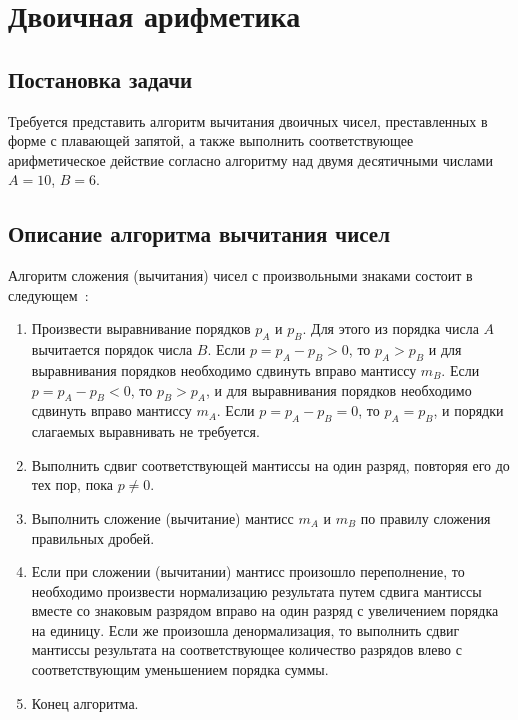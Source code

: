 \section{Двоичная арифметика}

\subsection{Постановка задачи}

Требуется представить алгоритм вычитания двоичных чисел, преставленных в форме с плавающей запятой,
а также выполнить соответствующее арифметическое действие согласно алгоритму над двумя десятичными
числами $A = 10$, $B = 6$.

\subsection{Описание алгоритма вычитания чисел}

Алгоритм сложения (вычитания) чисел с произвольными знаками состоит в следующем~\cite{lua}:

\begin{enumerate}
    \item Произвести выравнивание порядков $p_A$ и $p_B$. Для этого из порядка числа $A$ вычитается порядок числа $B$. 
    Если $p = p_A - p_B > 0$, то $p_A > p_B$ и для выравнивания порядков необходимо сдвинуть вправо мантиссу $m_B$. 
    Если $p = p_A - p_B < 0$, то $p_B > p_A$, и для выравнивания порядков необходимо сдвинуть вправо мантиссу $m_A$. 
    Если $p = p_A - p_B = 0$, то $p_A= p_B$, и порядки слагаемых выравнивать не требуется.

    \item Выполнить сдвиг соответствующей мантиссы на один разряд, повторяя его до тех пор, пока $p \neq 0$.

    \item Выполнить сложение (вычитание) мантисс $m_A$ и $m_B$ по правилу сложения правильных дробей.
    
    \item Если при сложении (вычитании) мантисс произошло переполнение, то необходимо произвести нормализацию результата 
    путем сдвига мантиссы вместе со знаковым разрядом вправо на один разряд с увеличением порядка на единицу. 
    Если же произошла денормализация, то выполнить сдвиг мантиссы результата на соответствующее количество разрядов 
    влево с соответствующим уменьшением порядка суммы.

    \item Конец алгоритма.
\end{enumerate}

